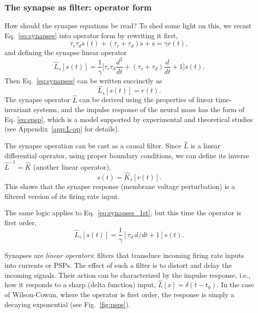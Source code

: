 \documentclass[11pt]{article}
\numberwithin{equation}{section}
\begin{document}
 \subsubsection*{The synapse as filter: operator form}
How should the synapse equations be read? To shed some light on this, we recast Eq.~\eqref{eq:synapses} into operator form by rewriting it first,
$$
    \tau_r\tau_d\ddot s(t) + (\tau_r+\tau_d) \dot s +s = \gamma r(t), 
$$
and defining the synapse linear operator
\begin{equation}
\hat L_s [s(t)]= \frac{1}{\gamma} \big[\tau_r\tau_d \frac{d^2}{dt} + (\tau_r+\tau_d) \frac{d}{dt}  +1\big]s(t).
\end{equation}
Then Eq.~\eqref{eq:synapses}  can be written succinctly as 
\begin{equation} \label{eq:L-operator-synapse-equation}
\hat L_s [s(t)] =  r(t) .
\end{equation}
The synapse operator $\hat{L}$ can be derived using the properties of linear time-invariant systems, and the impulse response of the neural mass has the form of Eq. \eqref{eq:epsp}, which is a model supported by experimental and theoretical studies \cite{rallDendriticLocationSynapses1967,burkeCompositeNatureMonosynaptic1967,nelsonAnomalousRectificationCat1967,rallDistinguishingTheoreticalSynaptic1967} (see Appendix~\ref{app:L-op} for details).

The synapse operation can be cast as a causal filter. Since $\hat L$ is a linear differential operator, using proper boundary conditions, we can define its inverse $\hat L ^{-1}= \hat K$ (another linear operator), 
\begin{equation} \label{eq:K-operator-synapse-equation}
s(t) = \hat K_s[ r(t)] .
\end{equation}
This shows that the synapse response (membrane voltage perturbation) is a filtered version of its firing rate input. 

The same logic applies to Eq.~\ref{eq:synapses_1st}, but this time the operator is first order,
\begin{equation}
\hat L_s [s(t)]= \frac{1}{\gamma}  [\tau_d\, d/dt  +1]s(t).
\end{equation}

Synapses are \textit{linear operators}:  filters that transduce incoming firing rate inputs into currents or PSPs.
 The effect of such a filter is to distort and delay the incoming signals.
Their action can be characterized by the impulse response, i.e.,   how it responds to a sharp (delta function) input, $\hat L[x] = \delta (t-t_0)$. In the case of Wilson-Cowan, where the operator is first order, the response is simply a decaying exponential (see Fig.~\ref{fig:psps}). 
\end{document}
